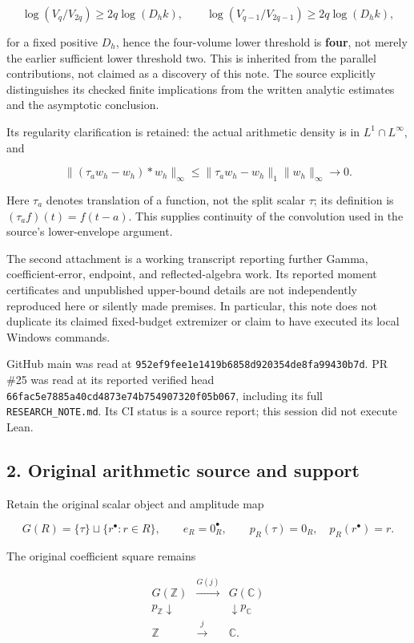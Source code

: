 \documentclass[
  11pt,
]{article}
\begin{document}
\[
 \log(V_q/V_{2q})\ge2q\log(D_hk),\qquad
 \log(V_{q-1}/V_{2q-1})\ge2q\log(D_hk),                         \tag{2}
\]

for a fixed positive \(D_h\), hence the four-volume lower threshold is
\textbf{four}, not merely the earlier sufficient lower threshold two.
This is inherited from the parallel contributions, not claimed as a
discovery of this note. The source explicitly distinguishes its checked
finite implications from the written analytic estimates and the
asymptotic conclusion.

Its regularity clarification is retained: the actual arithmetic density
is in \(L^1\cap L^\infty\), and

\[
 \|(\tau_aw_h-w_h)*w_h\|_\infty
 \le\|\tau_aw_h-w_h\|_1\|w_h\|_\infty\longrightarrow0.
\]

Here \(\tau_a\) denotes translation of a function, not the split scalar
\(\tau\); its definition is \((\tau_af)(t)=f(t-a)\). This supplies
continuity of the convolution used in the source's lower-envelope
argument.

The second attachment is a working transcript reporting further Gamma,
coefficient-error, endpoint, and reflected-algebra work. Its reported
moment certificates and unpublished upper-bound details are not
independently reproduced here or silently made premises. In particular,
this note does not duplicate its claimed fixed-budget extremizer or
claim to have executed its local Windows commands.

GitHub main was read at
\texttt{952ef9fee1e1419b6858d920354de8fa99430b7d}. PR \#25 was read at
its reported verified head
\texttt{66fac5e7885a40cd4873e74b754907320f05b067}, including its full
\texttt{RESEARCH\_NOTE.md}. Its CI status is a source report; this
session did not execute Lean.

\subsection{2. Original arithmetic source and
support}\label{original-arithmetic-source-and-support}

Retain the original scalar object and amplitude map

\[
 G(R)=\{\tau\}\sqcup\{r^\bullet:r\in R\},\qquad
 e_R=0_R^\bullet,\qquad
 p_R(\tau)=0_R,\quad p_R(r^\bullet)=r.
\]

The original coefficient square remains

\[
 \begin{array}{ccc}
 G(\mathbb Z)&\xrightarrow{G(j)}&G(\mathbb C)\\
 p_{\mathbb Z}\downarrow&&\downarrow p_{\mathbb C}\\
 \mathbb Z&\xrightarrow{j}&\mathbb C.
 \end{array}                                                     \tag{3}
\]
\end{document}
